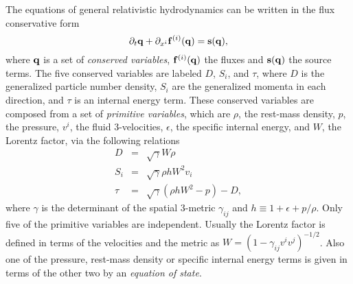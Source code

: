 \documentclass{article}
\begin{document}
The equations of general relativistic hydrodynamics can be written in
the flux conservative form
\begin{equation}
  \label{eq:consform1}
  \partial_t {\bf q} + \partial_{x^i} {\bf f}^{(i)} ({\bf q}) = {\bf
    s} ({\bf q}),
\end{equation}
where ${\bf q}$ is a set of {\it conserved variables}, ${\bf f}^{(i)}
({\bf q})$ the fluxes and ${\bf s} ({\bf q})$ the source
terms.
The five conserved variables are labeled $D$, $S_i$, and $\tau$, where
$D$ is the generalized particle number density, $S_i$ are the generalized
momenta in each direction, and $\tau$ is an internal energy term.
These conserved variables are composed from a set of {\it primitive variables},
which are $\rho$, the rest-mass density, $p$, the
pressure, $v^i$, the fluid 3-velocities, $\epsilon$, the specific internal
energy, and $W$, the Lorentz factor, via the following relations
% 
%
\
\begin{eqnarray}
  \label{eq:prim2con}
   D &=& \sqrt{\gamma}W\rho \nonumber \\
   S_i &=& \sqrt{\gamma} \rho h W^2 v_i \nonumber \\
   \tau &=& \sqrt{\gamma}\left( \rho h W^2 - p\right) - D, 
\end{eqnarray}
where $\gamma$ is the determinant of the spatial 3-metric $\gamma_{ij}$ and 
$h \equiv 1 + \epsilon + p/\rho$.
Only five of the primitive variables are
independent. Usually the Lorentz factor is defined in terms of the
velocities and the metric as $W = (1-\gamma_{ij}v^i v^j)^{-1/2}$.  
Also one of the pressure, rest-mass density or specific internal energy terms is given in 
terms of the other two by an {\it equation of state}.
\end{document}

